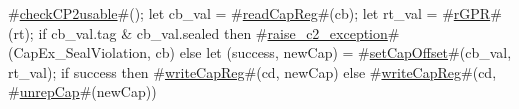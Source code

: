 #\hyperref[sailMIPSzcheckCP2usable]{checkCP2usable}#();
let cb_val = #\hyperref[sailMIPSzreadCapReg]{readCapReg}#(cb);
let rt_val = #\hyperref[sailMIPSzrGPR]{rGPR}#(rt);
if cb_val.tag & cb_val.sealed then
  #\hyperref[sailMIPSzraisezyc2zyexception]{raise\_c2\_exception}#(CapEx_SealViolation, cb)
else
{
  let (success, newCap) = #\hyperref[sailMIPSzsetCapOffset]{setCapOffset}#(cb_val, rt_val);
  if success then
      #\hyperref[sailMIPSzwriteCapReg]{writeCapReg}#(cd, newCap)
  else
      #\hyperref[sailMIPSzwriteCapReg]{writeCapReg}#(cd, #\hyperref[sailMIPSzunrepCap]{unrepCap}#(newCap))
}
